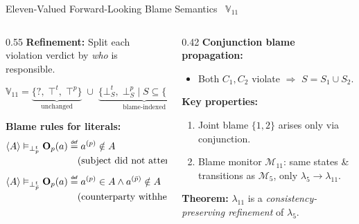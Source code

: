 \documentclass[9pt,aspectratio=169]{beamer}
\newcommand{\obl}[2][]{\mathbf{O}_{#1}(#2)}
\newcommand{\trace}[1]{\ensuremath{\langle #1 \rangle}\xspace}
\newcommand{\topt}{\top^t}
\newcommand{\topp}{\top^p}
\newcommand{\bottp}[1]{\mathbin{\bot^{t}_{#1}}}
\newcommand{\mydef}{\mathrel{\overset{\makebox[0pt]{\mbox{\normalfont\tiny\sffamily def}}}{=}}}
\begin{document}
\begin{frame}{Eleven-Valued Forward-Looking Blame Semantics \textemdash\ $\mathbb{V}_{11}$}
\small
\begin{columns}[T]
\begin{column}{0.55\textwidth}
  \textbf{Refinement:} Split each violation verdict by \emph{who} is responsible.

  \[
  \mathbb{V}_{11} =
    \underbrace{\{?,\;\topt,\;\topp\}}_{\text{unchanged}}
    \;\cup\;
    \underbrace{\{\bot^t_S,\;\bot^p_S \mid S \subseteq \{1,2\}\}}_{\text{blame-indexed}}
  \]

  \textbf{Blame rules for literals:}
  \begin{align*}
    \trace{A} \vDash_{\bottp{p}} \obl[p]{a}
      &\mydef a^{(p)} \notin A\\[-2pt]
      &\quad\text{(subject did not attempt)}\\[4pt]
    \trace{A} \vDash_{\bottp{\bar{p}}} \obl[p]{a}
      &\mydef a^{(p)} \in A \wedge a^{(\bar{p})} \notin A\\[-2pt]
      &\quad\text{(counterparty withheld)}
  \end{align*}
\end{column}
\begin{column}{0.42\textwidth}
  \textbf{Conjunction blame propagation:}
  \begin{itemize}
    \item Both $C_1, C_2$ violate $\Rightarrow$ $S = S_1 \cup S_2$.
  \end{itemize}

  \medskip
  \textbf{Key properties:}
  \begin{enumerate}
    \item Joint blame $\{1,2\}$ arises only via conjunction.
    \item Blame monitor $\mathcal{M}_{11}$: same states \& transitions as $\mathcal{M}_5$, only $\lambda_5 \to \lambda_{11}$.
  \end{enumerate}

  \vspace{2mm}
  \textbf{Theorem:} $\lambda_{11}$ is a \emph{consistency-preserving refinement} of $\lambda_5$.
\end{column}
\end{columns}
\end{frame}
\end{document}
